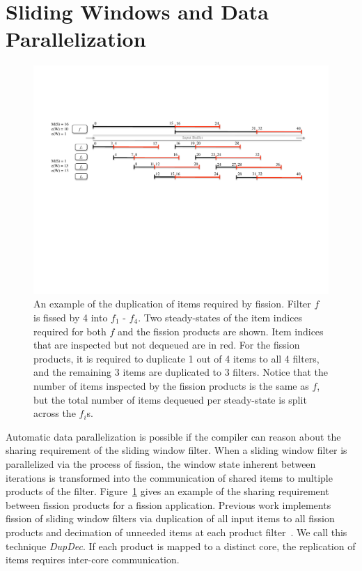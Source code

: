 \section{Sliding Windows and Data Parallelization}

\begin{figure}[t]
\centering
\includegraphics[width=6.0in]{figures/fission-sharing.pdf}
\caption[An example of the sharing required by fission.]  { An
  example of the duplication of items required by fission.  Filter $f$
  is fissed by 4 into $f_1$ - $f_4$.  Two steady-states of the item
  indices required for both $f$ and the fission products are shown.
  Item indices that are inspected but not dequeued are in red.  For the
  fission products, it is required to duplicate 1 out of 4 items to
  all 4 filters, and the remaining 3 items are duplicated to 3
  filters.  Notice that the number of items inspected by the fission
  products is the same as $f$, but the total number of items dequeued 
per steady-state is split across the $f_i$s.
\label{fig:fission-sharing}}
\vspace{-10pt}
\end{figure}




Automatic data parallelization is possible if the compiler can reason
about the sharing requirement of the sliding window filter.  When a
sliding window filter is parallelized via the process of fission, the
window state inherent between iterations is transformed into the
communication of shared items to multiple products of the filter.
Figure~\ref{fig:fission-sharing} gives an example of the sharing
requirement between fission products for a fission application.
Previous work implements fission of sliding window filters via
duplication of all input items to all fission products and decimation
of unneeded items at each product filter~\cite{streamit-asplos}.  We
call this technique {\it DupDec}. If each product is mapped to a
distinct core, the replication of items requires inter-core
communication.

